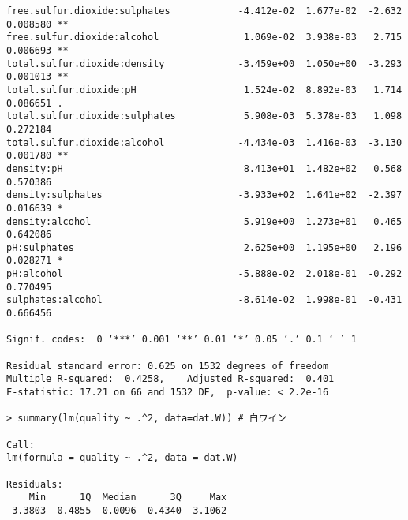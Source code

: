 \documentclass{jsarticle}
\begin{document}
\begin{verbatim}
free.sulfur.dioxide:sulphates            -4.412e-02  1.677e-02  -2.632 0.008580 ** 
free.sulfur.dioxide:alcohol               1.069e-02  3.938e-03   2.715 0.006693 ** 
total.sulfur.dioxide:density             -3.459e+00  1.050e+00  -3.293 0.001013 ** 
total.sulfur.dioxide:pH                   1.524e-02  8.892e-03   1.714 0.086651 .  
total.sulfur.dioxide:sulphates            5.908e-03  5.378e-03   1.098 0.272184    
total.sulfur.dioxide:alcohol             -4.434e-03  1.416e-03  -3.130 0.001780 ** 
density:pH                                8.413e+01  1.482e+02   0.568 0.570386    
density:sulphates                        -3.933e+02  1.641e+02  -2.397 0.016639 *  
density:alcohol                           5.919e+00  1.273e+01   0.465 0.642086    
pH:sulphates                              2.625e+00  1.195e+00   2.196 0.028271 *  
pH:alcohol                               -5.888e-02  2.018e-01  -0.292 0.770495    
sulphates:alcohol                        -8.614e-02  1.998e-01  -0.431 0.666456    
---
Signif. codes:  0 ‘***’ 0.001 ‘**’ 0.01 ‘*’ 0.05 ‘.’ 0.1 ‘ ’ 1

Residual standard error: 0.625 on 1532 degrees of freedom
Multiple R-squared:  0.4258,    Adjusted R-squared:  0.401 
F-statistic: 17.21 on 66 and 1532 DF,  p-value: < 2.2e-16

> summary(lm(quality ~ .^2, data=dat.W)) # 白ワイン

Call:
lm(formula = quality ~ .^2, data = dat.W)

Residuals:
    Min      1Q  Median      3Q     Max 
-3.3803 -0.4855 -0.0096  0.4340  3.1062 


\end{verbatim}
\end{document}
